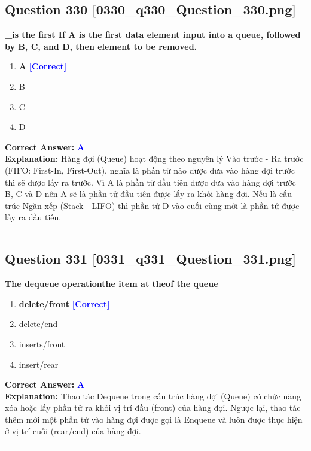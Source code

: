 \documentclass[11pt,a4paper]{article}
\begin{document}
\begin{minipage}{\textwidth}
\subsection*{Question 330 \quad \footnotesize{[0330\_q330\_Question\_330.png]}}
\noindent \textbf{\_is the first If A is the first data element input into a queue, followed by B, C, and D, then element to be removed.}

\begin{enumerate}[label=\Alph*.]
    \item \textbf{A} \hfill \textcolor{blue}{\textbf{[Correct]}}
    \item B
    \item C
    \item D
\end{enumerate}

\noindent \textbf{Correct Answer:} \textcolor{blue}{\textbf{A}} \\[2pt]
\noindent \textbf{Explanation:} Hàng đợi (Queue) hoạt động theo nguyên lý Vào trước - Ra trước (FIFO: First-In, First-Out), nghĩa là phần tử nào được đưa vào hàng đợi trước thì sẽ được lấy ra trước. Vì A là phần tử đầu tiên được đưa vào hàng đợi trước B, C và D nên A sẽ là phần tử đầu tiên được lấy ra khỏi hàng đợi. Nếu là cấu trúc Ngăn xếp (Stack - LIFO) thì phần tử D vào cuối cùng mới là phần tử được lấy ra đầu tiên.

\par\vspace{0.3cm}
\hrule
\vspace{0.3cm}
\end{minipage}

\begin{minipage}{\textwidth}
\subsection*{Question 331 \quad \footnotesize{[0331\_q331\_Question\_331.png]}}
\noindent \textbf{The dequeue operationthe item at theof the queue}

\begin{enumerate}[label=\Alph*.]
    \item \textbf{delete/front} \hfill \textcolor{blue}{\textbf{[Correct]}}
    \item delete/end
    \item inserts/front
    \item insert/rear
\end{enumerate}

\noindent \textbf{Correct Answer:} \textcolor{blue}{\textbf{A}} \\[2pt]
\noindent \textbf{Explanation:} Thao tác Dequeue trong cấu trúc hàng đợi (Queue) có chức năng xóa hoặc lấy phần tử ra khỏi vị trí đầu (front) của hàng đợi. Ngược lại, thao tác thêm mới một phần tử vào hàng đợi được gọi là Enqueue và luôn được thực hiện ở vị trí cuối (rear/end) của hàng đợi.

\par\vspace{0.3cm}
\hrule
\vspace{0.3cm}
\end{minipage}
\end{document}
